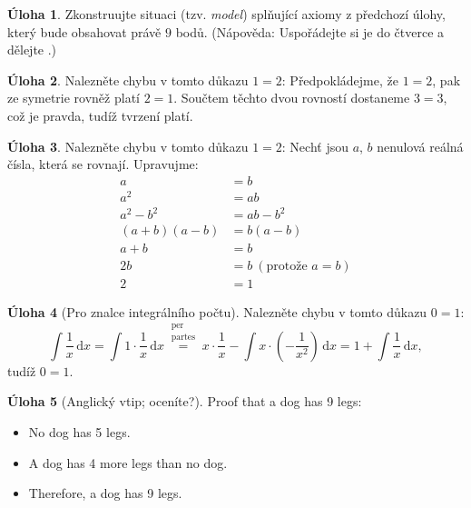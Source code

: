 \documentclass[9pt,a5paper]{extarticle}
\newcommand{\hint}[1]{{\color{gray}\footnotesize\noindent(Nápověda: #1)}}
\theoremstyle{definition}
\newtheorem{uloha}{\atr Úloha}
\let\ee\expandafter
\def\locvysl#1{\ee\gdef\ee\locvysld\ee{\locvysld\item #1}}
\let\lv\locvysl
\newenvironment{ulohav}[1][]{\begin{uloha}[#1]\gdef\locvysld{\begin{enumerate*}}}{\ee\vyslplain\ee{\locvysld\end{enumerate*}}\end{uloha}}
\def\atr{}
\def\basic{\def\atr{\llap{\mdseries$\sun$ }\gdef\atr{}}}
\def\interest{\def\atr{\llap{$\star$ }\gdef\atr{}}}
\begin{document}
\interest
\begin{uloha}
Zkonstruujte situaci (tzv. \emph{model}) splňující axiomy z předchozí úlohy, který bude obsahovat právě $9$ bodů. \hint{Uspořádejte si je do čtverce a dělejte \uv{něco jako přímky}.}
\end{uloha}


\begin{uloha}
Nalezněte chybu v tomto důkazu $1=2$: Předpokládejme, že $1 = 2$, pak ze symetrie rovněž platí $2 = 1$. Součtem těchto dvou rovností dostaneme $3 = 3$, což je pravda, tudíž tvrzení platí.
\end{uloha}


\begin{uloha}
Nalezněte chybu v tomto důkazu $1=2$: Nechť jsou $a$, $b$ nenulová reálná čísla, která se rovnají. Upravujme:
\begin{align*}
    a&=b \\
    a^2 &= ab \\
    a^2 - b^2 &= ab - b^2 \\
    (a+b)(a-b) &= b(a-b) \\
    a+b &= b \\
    2b &= b\ (\text{protože }a=b) \\
    2 &= 1
\end{align*}
\end{uloha}


\begin{uloha}[Pro znalce integrálního počtu]
\def\dx{\,\mathrm{d}x}
Nalezněte chybu v tomto důkazu $0=1$:
\[ \int \frac1x \dx = \int 1 \cdot \frac1x \dx \stackrel{\substack{\text{per}\\ \text{partes}}}= x \cdot \frac1x - \int x \cdot \left(-\frac1{x^2}\right) \dx = 1 + \int \frac1x \dx, \]
tudíž $0 = 1$.
\end{uloha}

\basic
\begin{uloha}[Anglický vtip; oceníte?]
Proof that a dog has 9 legs:
\begin{itemize}
    \item No dog has 5 legs.
    \item A dog has 4 more legs than no dog.
    \item Therefore, a dog has 9 legs.
\end{itemize}

\end{uloha}



\end{document}
